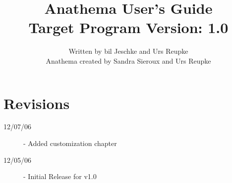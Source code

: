 \documentclass[]{report}
\title{Anathema User's Guide\\ Target Program Version: 1.0}
\author{Written by bil Jeschke and Urs Reupke \\ Anathema created by Sandra Sieroux and Urs Reupke}
\date{}
\begin{document}
\maketitle
\sffamily
{}
\tableofcontents
\pagebreak
\setcounter{page}{1}





\appendix


\chapter*{Revisions}
\begin{description}
\item[12/07/06] - Added customization chapter
\item[12/05/06] - Initial Release for v1.0
\end{description}
\end{document}
